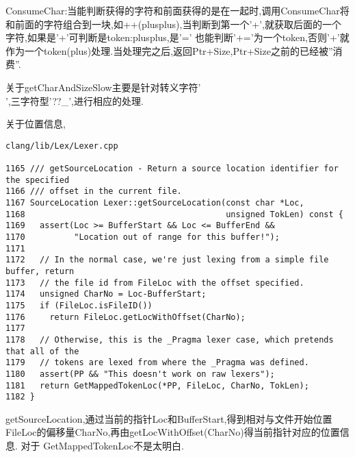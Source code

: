 \par{ConsumeChar:当能判断获得的字符和前面获得的是在一起时,调用ConsumeChar将和前面的字符组合到一块,如++(plusplus),当判断到第一个'+',就获取后面的一个字符,如果是'+'可判断是token:plusplus,是'=' 也能判断'+='为一个token,否则'+'就作为一个token(plus)处理.当处理完之后,返回Ptr+Size,Ptr+Size之前的已经被”消费”.


关于getCharAndSizeSlow主要是针对转义字符'\\',三字符型'??\_',进行相应的处理.}



关于位置信息,
\begin{lstlisting}
clang/lib/Lex/Lexer.cpp

1165 /// getSourceLocation - Return a source location identifier for the specified 
1166 /// offset in the current file. 
1167 SourceLocation Lexer::getSourceLocation(const char *Loc, 
1168                                         unsigned TokLen) const { 
1169   assert(Loc >= BufferStart && Loc <= BufferEnd && 
1170          "Location out of range for this buffer!"); 
1171  
1172   // In the normal case, we're just lexing from a simple file buffer, return 
1173   // the file id from FileLoc with the offset specified. 
1174   unsigned CharNo = Loc-BufferStart; 
1175   if (FileLoc.isFileID()) 
1176     return FileLoc.getLocWithOffset(CharNo); 
1177  
1178   // Otherwise, this is the _Pragma lexer case, which pretends that all of the 
1179   // tokens are lexed from where the _Pragma was defined. 
1180   assert(PP && "This doesn't work on raw lexers"); 
1181   return GetMappedTokenLoc(*PP, FileLoc, CharNo, TokLen); 
1182 }
\end{lstlisting}
\par{getSourceLocation,通过当前的指针Loc和BufferStart,得到相对与文件开始位置FileLoc的偏移量CharNo,再由getLocWithOffset(CharNo)得当前指针对应的位置信息.  对于 GetMappedTokenLoc不是太明白.}

